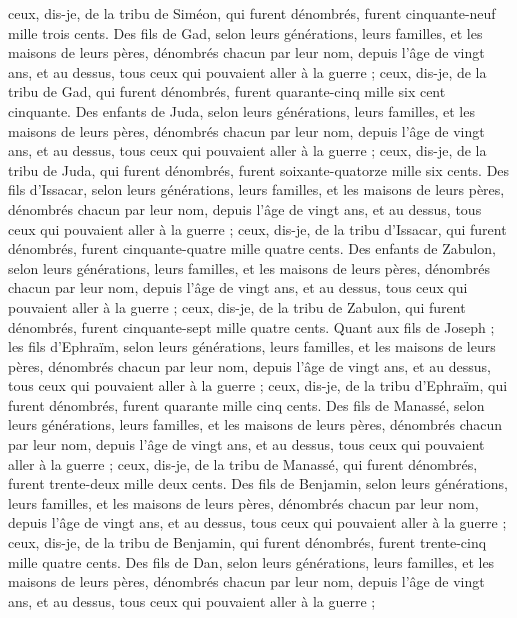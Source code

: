 \begin{multicols}{2}
ceux, dis-je, de la tribu de Siméon, qui furent dénombrés, furent cinquante-neuf mille trois cents.
Des fils de Gad, selon leurs générations, leurs familles, et les maisons de leurs pères, dénombrés chacun par leur nom, depuis l'âge de vingt ans, et au dessus, tous ceux qui pouvaient aller à la guerre ;
ceux, dis-je, de la tribu de Gad, qui furent dénombrés, furent quarante-cinq mille six cent cinquante.
Des enfants de Juda, selon leurs générations, leurs familles, et les maisons de leurs pères, dénombrés chacun par leur nom, depuis l'âge de vingt ans, et au dessus, tous ceux qui pouvaient aller à la guerre ;
ceux, dis-je, de la tribu de Juda, qui furent dénombrés, furent soixante-quatorze mille six cents.
Des fils d'Issacar, selon leurs générations, leurs familles, et les maisons de leurs pères, dénombrés chacun par leur nom, depuis l'âge de vingt ans, et au dessus, tous ceux qui pouvaient aller à la guerre ;
ceux, dis-je, de la tribu d'Issacar, qui furent dénombrés, furent cinquante-quatre mille quatre cents.
Des enfants de Zabulon, selon leurs générations, leurs familles, et les maisons de leurs pères, dénombrés chacun par leur nom, depuis l'âge de vingt ans, et au dessus, tous ceux qui pouvaient aller à la guerre ;
ceux, dis-je, de la tribu de Zabulon, qui furent dénombrés, furent cinquante-sept mille quatre cents.
Quant aux fils de Joseph ; les fils d'Ephraïm, selon leurs générations, leurs familles, et les maisons de leurs pères, dénombrés chacun par leur nom, depuis l'âge de vingt ans, et au dessus, tous ceux qui pouvaient aller à la guerre ;
ceux, dis-je, de la tribu d'Ephraïm, qui furent dénombrés, furent quarante mille cinq cents.
Des fils de Manassé, selon leurs générations, leurs familles, et les maisons de leurs pères, dénombrés chacun par leur nom, depuis l'âge de vingt ans, et au dessus, tous ceux qui pouvaient aller à la guerre ;
ceux, dis-je, de la tribu de Manassé, qui furent dénombrés, furent trente-deux mille deux cents.
Des fils de Benjamin, selon leurs générations, leurs familles, et les maisons de leurs pères, dénombrés chacun par leur nom, depuis l'âge de vingt ans, et au dessus, tous ceux qui pouvaient aller à la guerre ;
ceux, dis-je, de la tribu de Benjamin, qui furent dénombrés, furent trente-cinq mille quatre cents.
Des fils de Dan, selon leurs générations, leurs familles, et les maisons de leurs pères, dénombrés chacun par leur nom, depuis l'âge de vingt ans, et au dessus, tous ceux qui pouvaient aller à la guerre ;

\end{multicols}
